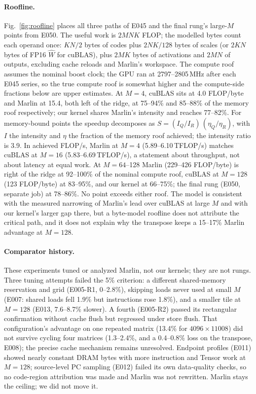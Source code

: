 \documentclass[sigconf,nonacm]{acmart}
\begin{document}
\paragraph{Roofline.} Fig.~\ref{fig:roofline} places all three paths of E045 and the final rung's large-$M$ points from E050. The useful work is $2MNK$ FLOP; the modelled bytes count each operand once: $KN/2$ bytes of codes plus $2NK/128$ bytes of scales (or $2KN$ bytes of FP16 $\hat W$ for cuBLAS), plus $2MK$ bytes of activations and $2MN$ of outputs, excluding cache reloads and Marlin's workspace. The compute roof assumes the nominal boost clock; the GPU ran at 2797--2805\,MHz after each E045 series, so the true compute roof is somewhat higher and the compute-side fractions below are upper estimates. At $M=4$, cuBLAS sits at 4.0 FLOP/byte and Marlin at 15.4, both left of the ridge, at 75--94\% and 85--88\% of the memory roof respectively; our kernel shares Marlin's intensity and reaches 77--82\%. For memory-bound points the speedup decomposes as $S = (I_Q/I_R)\,(\eta_Q/\eta_R)$, with $I$ the intensity and $\eta$ the fraction of the memory roof achieved; the intensity ratio is 3.9. In achieved FLOP/s, Marlin at $M=4$ (5.89--6.10\,TFLOP/s) matches cuBLAS at $M=16$ (5.83--6.69\,TFLOP/s), a statement about throughput, not about latency at equal work. At $M=64$--128 Marlin (229--426 FLOP/byte) is right of the ridge at 92--100\% of the nominal compute roof, cuBLAS at $M=128$ (123 FLOP/byte) at 83--95\%, and our kernel at 66--75\%; the final rung (E050, separate job) at 78--86\%. No point exceeds either roof. The model is consistent with the measured narrowing of Marlin's lead over cuBLAS at large $M$ and with our kernel's larger gap there, but a byte-model roofline does not attribute the critical path, and it does not explain why the transpose keeps a 15--17\% Marlin advantage at $M=128$.

\paragraph{Comparator history.} These experiments tuned or analyzed Marlin, not our kernels; they are not rungs. Three tuning attempts failed the 5\% criterion: a different shared-memory reservation and grid (E005-R1, 0--2.8\%), skipping loads never used at small $M$ (E007: shared loads fell 1.9\% but instructions rose 1.8\%), and a smaller tile at $M=128$ (E013, 7.6--8.7\% slower). A fourth (E005-R2) passed its rectangular confirmation without cache flush but regressed under store flush. That configuration's advantage on one repeated matrix (13.4\% for $4096\times11008$) did not survive cycling four matrices (1.3--2.4\%, and a 0.4--0.8\% loss on the transpose, E008); the precise cache mechanism remains unresolved. Endpoint profiles (E011) showed nearly constant DRAM bytes with more instruction and Tensor work at $M=128$; source-level PC sampling (E012) failed its own data-quality checks, so no code-region attribution was made and Marlin was not rewritten. Marlin stays the ceiling; we did not move it.
\end{document}
